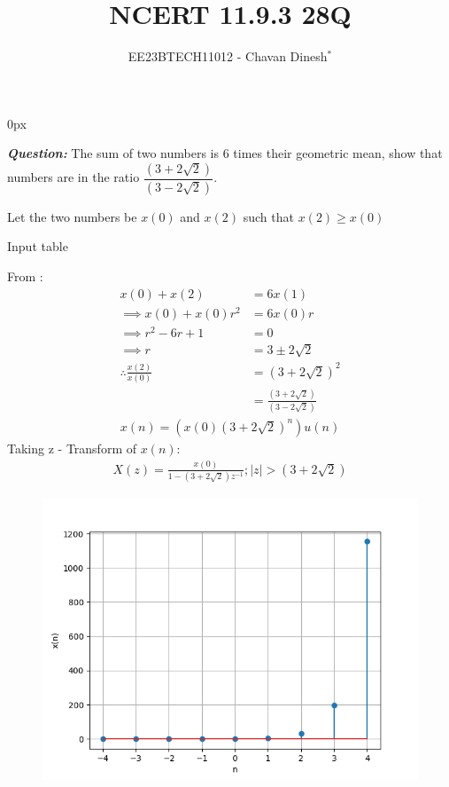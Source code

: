 \documentclass[journal,12pt,twocolumn]{IEEEtran}
\theoremstyle{remark}
\begin{document}
\parindent 0px

\vspace{3cm}

\title{NCERT 11.9.3 28Q}
\author{EE23BTECH11012 - Chavan Dinesh$^{*}$%
}
\maketitle
\newpage
\bigskip

\renewcommand{\thefigure}{\arabic{figure}}
\renewcommand{\thetable}{\arabic{table}}
\large\textbf{\textsl{Question:}}
The sum of two numbers is $6$ times their geometric mean, show that numbers are in the ratio $\dfrac{(3+2\sqrt{2})}{(3-2\sqrt{2})}$.

\solution
Let the two numbers be $x(0)$ and $x(2)$ such that $x(2)\geq x(0)$ 
\begin{table}[htbp]
    \centering
    
    \caption{Input table}
    \label{tab:parameter_table.11.9.3.28}
\end{table}

From :
\begin{align}
x(0) + x(2) &= 6x(1) \\
\implies x(0) + x(0)r^2 &= 6x(0)r \\
\implies r^2 - 6r +1 &= 0 \\
\implies r &= 3\pm 2\sqrt{2}\\
    \therefore \frac{x(2)}{x(0)} &= (3 + 2\sqrt{2})^2 \\
    &=  \frac{(3+2\sqrt{2})}{(3-2\sqrt{2})}
\end{align}
\begin{align}
x(n) = (x(0)(3 + 2\sqrt{2})^n)u(n)
\end{align}
Taking z - Transform of $x(n)$:
\begin{align}
    X(z) = \frac{x(0)}{1 - (3 + 2\sqrt{2})z^{-1}} ; |z| > (3 + 2\sqrt{2})
\end{align}
\begin{figure}[ht]
    \centering
    \includegraphics[width = \columnwidth]{figs/x_n_stem_plot.png}
    \caption{}
    \label{fig:graph1}
\end{figure}


\end{document}
